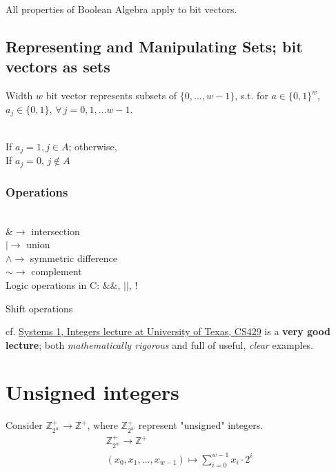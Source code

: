 \documentclass[10pt]{amsart}
\begin{document}
\begin{multicols*}{2}
All properties of Boolean Algebra apply to bit vectors.

\subsection{Representing and Manipulating Sets; bit vectors as sets}

Width $w$ bit vector represents subsets of $\lbrace 0 ,\dots, w-1 \rbrace$, s.t. for $a\in \lbrace 0 ,1 \rbrace^w$, $a_j \in \lbrace 0 , 1 \rbrace$, $\forall \, j = 0,1,\dots w -1$. 

\qquad \\
If $a_j = 1, j \in A$; otherwise, \\
If $a_j =0$, $j \notin A$
\qquad \\

\subsubsection{Operations}

\qquad \\
$\& \to $ intersection \\
$| \to $ union \\
$\wedge \to $ symmetric difference \\
$\sim \to $ complement
\qquad \\

Logic operations in C: $\& \&$, $||$, $!$ 

Shift operations



cf. \href{https://www.cs.utexas.edu/users/fussell/courses/cs429h/lectures/Lecture_3-429h.pdf}{Systems 1, Integers lecture at University of Texas, CS429} is a \textbf{very good lecture}; both \emph{mathematically rigorous} and full of useful, \emph{clear} examples.

\section{Unsigned integers}

Consider $\mathbb{Z}^+_{2^w} \to \mathbb{Z}^+$, where $\mathbb{Z}^+_{2^w}$ represent "unsigned" integers. 
\begin{equation}
\begin{gathered}
\mathbb{Z}^+_{2^w} \to \mathbb{Z}^+ \\ 
(x_0, x_1 , \dots , x_{w-1}) \mapsto \sum_{i=0}^{w-1} x_i \cdot 2^i 
\end{gathered}
\end{equation}


\end{multicols*}
\end{document}
